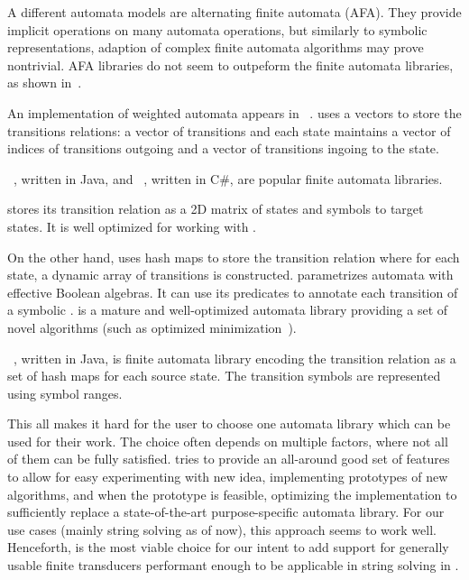 A different automata models are alternating finite automata (AFA).
They provide implicit operations on many automata operations, but similarly to symbolic representations, adaption of complex finite automata algorithms may prove nontrivial.
AFA libraries do not seem to outpeform the finite automata libraries, as shown in~\cite{cade23_reasoning_regular_properties_comparision_DBLP:conf/cade/FiedorHHRSV23}.

An implementation of weighted automata appears in \awali~\cite{Awali}.
\awali uses a vectors to store the transitions relations: a vector of transitions and each state maintains a vector of indices of transitions outgoing and a vector of transitions ingoing to the state.

\automatajar~\cite{automatajar}, written in Java, and \automatanet~\cite{automatanet}, written in C\#, are popular finite automata libraries.

\automatajar stores its transition relation as a 2D matrix of states and symbols to target states.
It is well optimized for working with \dfas.

On the other hand, \automatanet uses hash maps to store the transition relation where for each state, a dynamic array of transitions is constructed.
\automatanet parametrizes automata with effective Boolean algebras.
It can use its predicates to annotate each transition of a symbolic \nfa.
\automatanet is a mature and well-optimized automata library providing a set of novel algorithms (such as optimized minimization~\cite{margus_minimization}).

\brics~\cite{brics}, written in Java, is finite automata library encoding the transition relation as a set of hash maps for each source state.
The transition symbols are represented using symbol ranges.

This all makes it hard for the user to choose one automata library which can be used for their work.
The choice often depends on multiple factors, where not all of them can be fully satisfied.
\mata tries to provide an all-around good set of features to allow for easy experimenting with new idea, implementing prototypes of new algorithms, and when the prototype is feasible, optimizing the implementation to sufficiently replace a state-of-the-art purpose-specific automata library.
For our use cases (mainly string solving as of now), this approach seems to work well.
Henceforth, \mata is the most viable choice for our intent to add support for generally usable finite transducers performant enough to be applicable in string solving in \noodler.

